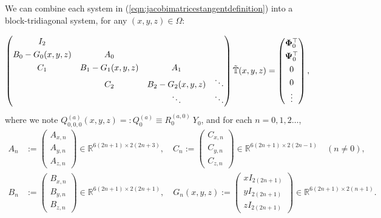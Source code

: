 \documentclass[11pt, oneside]{article}   	%
\newcommand{\R}{\mathbb{R}}
\newcommand{\genjac}{R}
\newcommand{\scop}{Q}
\newcommand{\scopa}{\scop^{(a)}}
\newcommand{\ch}{Y}
\newcommand{\bigtsop}{\mathbb{T}}
\newcommand{\bigtsopt}{\tilde{\bigtsop}}
\newcommand{\tsopi}{\bm{\Phi}}
\newcommand{\tsopii}{\bm{\Psi}}
\begin{document}
We can combine each system in (\ref{eqn:jacobimatricestangentdefinition}) into a block-tridiagonal system, for any $(x,y,z) \in \Omega$:

\begin{align*}
\renewcommand\arraystretch{1.3}
\begin{pmatrix}
		I_2 & & & \\
		B_0-G_0(x,y,z) & A_0 & & \\
		C_1 & B_1-G_1(x,y,z) & \quad A_1 \quad & \\
		& C_2 & B_2 - G_2(x,y,z)  & \ddots \\
		& & \ddots &\ddots
\end{pmatrix}
\bigtsopt(x,y,z)
=
\begin{pmatrix}
	 \tsopi_0^\top \\ \tsopii_0^\top \\ 0 \\ 0 \\ \vdots  \\
\end{pmatrix},
\end{align*}
where we note $\scopa_{0,0,0}(x,y,z) =: \scopa_0 \equiv \genjac_0^{(a,0)} \: \ch_0$, and for each $n = 0,1,2\dots$,
\begin{align*}
A_n &:= \begin{pmatrix}
		A_{x,n} \\
		A_{y,n} \\
		A_{z,n}
	    \end{pmatrix} \in \R^{6(2n+1)\times2(2n+3)}, \quad
C_n := \begin{pmatrix}
		C_{x,n} \\
		C_{y,n} \\
		C_{z,n}
	    \end{pmatrix} \in \R^{6(2n+1)\times2(2n-1)} \quad (n \ne 0), \nonumber \\
B_n &:= \begin{pmatrix}
		B_{x,n} \\
		B_{y,n} \\
		B_{z,n}
	    \end{pmatrix} \in \R^{6(2n+1)\times2(2n+1)}, \quad
G_n(x,y,z) := \begin{pmatrix}
		xI_{2(2n+1)} \\
		yI_{2(2n+1)} \\
		zI_{2(2n+1)}
	    \end{pmatrix} \in \R^{6(2n+1)\times2(n+1)}.
\end{align*}
 
\end{document}
